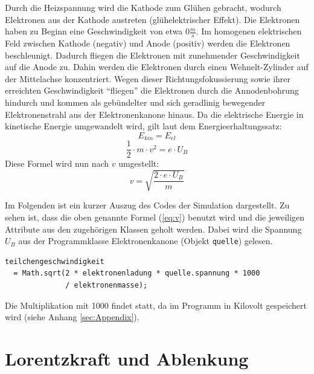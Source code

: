 Durch die Heizspannung wird die Kathode zum Glühen gebracht, wodurch Elektronen aus der Kathode austreten (glühelektrischer Effekt).
Die Elektronen haben zu Beginn eine Geschwindigkeit von etwa $0 \frac{m}{s}$.
Im homogenen elektrischen Feld zwischen Kathode (negativ) und Anode (positiv) werden die Elektronen beschleunigt.
Dadurch fliegen die Elektronen mit zunehmender Geschwindigkeit auf die Anode zu.
Dahin werden die Elektronen durch einen Wehnelt-Zylinder auf der Mittelachse konzentriert.
Wegen dieser Richtungsfokussierung sowie ihrer erreichten Geschwindigkeit "`fliegen"' die Elektronen durch die Annodenbohrung hindurch und kommen als gebündelter und sich geradlinig bewegender Elektronenstrahl aus der Elektronenkanone hinaus.
Da die elektrische Energie in kinetische Energie umgewandelt wird, gilt laut dem Energieerhaltungssatz:
\begin{equation}
\label{eq:Energie}
   E_{kin} = E_{el}  
\end{equation}
$$ \frac{1}{2} \cdot m \cdot v^2 = e \cdot U_B$$
Diese Formel wird  nun nach $v$ umgestellt:
\begin{equation}
\label{eq:v}
   v = \sqrt{\frac{2 \cdot e \cdot U_B}{m}} 
\end{equation}

Im Folgenden ist ein kurzer Auszug des Codes der Simulation dargestellt.
Zu sehen ist, dass die oben genannte Formel (\ref{eq:v}) benutzt wird und die jeweiligen Attribute aus den zugehörigen Klassen geholt werden.
Dabei wird die Spannung $U_B$ aus der Programmklasse Elektronenkanone (Objekt \lstinline$quelle$) gelesen.

\begin{lstlisting}
teilchengeschwindigkeit 
  = Math.sqrt(2 * elektronenladung * quelle.spannung * 1000 
              / elektronenmasse);
\end{lstlisting}
Die Multiplikation mit 1000 findet statt, da im Programm in Kilovolt gespeichert wird (siehe Anhang \ref{sec:Appendix}).
\section{Lorentzkraft und Ablenkung}
\label{sec:a}

